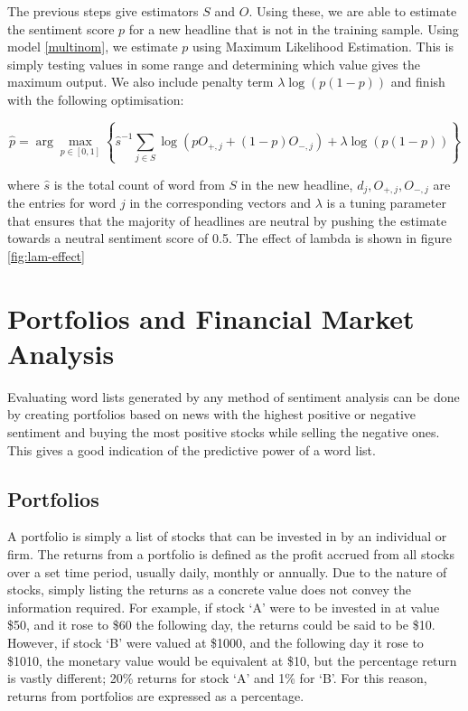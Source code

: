 The previous steps give estimators $S$ and $O$. Using these, we are able to estimate the sentiment score $p$ for a new headline that is not in the training sample. Using model \ref{multinom}, we estimate $p$ using Maximum Likelihood Estimation. This is simply testing values in some range and determining which value gives the maximum output. We also include penalty term $\lambda \log(p(1-p))$ and finish with the following optimisation:

\begin{equation}
\widehat p = \arg \max_{p \in [0,1]} \left\{ \widehat s^{-1} \sum_{j \in S} \log (p O_{+,j} + (1-p) O_{-,j}) + \lambda \log(p(1-p)) \right\}
\end{equation}

\noindent
where $\widehat s$ is the total count of word from $S$ in the new headline, $d_j, O_{+,j}, O_{-,j}$ are the entries for word $j$ in the corresponding vectors and $\lambda$ is a tuning parameter that ensures that the majority of headlines are neutral by pushing the estimate towards a neutral sentiment score of 0.5. The effect of lambda is shown in figure \ref{fig:lam-effect}




\section{Portfolios and Financial Market Analysis}
\label{sec:portfolios-analysis}
Evaluating word lists generated by any method of sentiment analysis can be done by creating portfolios based on news with the highest positive or negative sentiment and buying the most positive stocks while selling the negative ones. This gives a good indication of the predictive power of a word list.

\subsection{Portfolios}
\label{sub:portfolios}
A portfolio is simply a list of stocks that can be invested in by an individual or firm. The returns from a portfolio is defined as the profit accrued from all stocks over a set time period, usually daily, monthly or annually. Due to the nature of stocks, simply listing the returns as a concrete value does not convey the information required. For example, if stock `A' were to be invested in at value \$50, and it rose to \$60 the following day, the returns could be said to be \$10. However, if stock `B' were valued at \$1000, and the following day it rose to \$1010, the monetary value would be equivalent at \$10, but the percentage return is vastly different; 20\% returns for stock `A' and 1\% for `B'. For this reason, returns from portfolios are expressed as a percentage.

